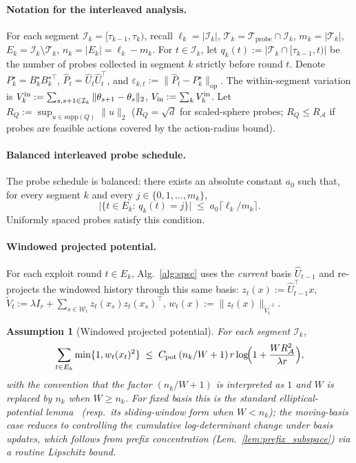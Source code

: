 \documentclass{article}
\newcommand{\op}{\mathrm{op}}
\newcommand{\cA}{\mathcal{A}}
\newcommand{\cT}{\mathcal{T}}
\newcommand{\cI}{\mathcal{I}}
\newcommand{\cW}{\mathcal{W}}
\newcommand{\cTprobe}{\mathcal{T}_{\mathrm{probe}}}
\newtheorem{assumption}{Assumption}
\begin{document}
\paragraph{Notation for the interleaved analysis.}
For each segment $\cI_k=[\tau_{k-1},\tau_k)$, recall
$\ell_k=|\cI_k|$, $\cT_k=\cTprobe\cap\cI_k$, $m_k=|\cT_k|$,
$E_k=\cI_k\setminus\cT_k$, $n_k=|E_k|=\ell_k-m_k$. For
$t\in\cI_k$, let $q_k(t):=|\cT_k\cap[\tau_{k-1},t)|$ be the number
of probes collected in segment $k$ strictly before round $t$.
Denote $P_k^\star=B_k^\star B_k^{\star\top}$,
$\widehat P_t=\widehat U_t\widehat U_t^\top$, and
$\varepsilon_{k,t}:=\|\widehat P_t-P_k^\star\|_{\op}$. The
within-segment variation is
$V_k^{\rm in}:=\sum_{s,s+1\in\cI_k}\|\theta_{s+1}-\theta_s\|_2$,
$V_{\rm in}:=\sum_k V_k^{\rm in}$. Let
$R_Q:=\sup_{u\in\mathrm{supp}(Q)}\|u\|_2$ ($R_Q=\sqrt d$ for
scaled-sphere probes; $R_Q\le R_\cA$ if probes are feasible
actions covered by the action-radius bound).

\paragraph{Balanced interleaved probe schedule.}
The probe schedule is balanced: there exists an absolute constant
$a_0$ such that, for every segment $k$ and every
$j\in\{0,1,\dots,m_k\}$,
\begin{equation}
\bigl|\{t\in E_k:\,q_k(t)=j\}\bigr|
\;\le\; a_0\bigl\lceil\ell_k/m_k\bigr\rceil.
\tag{B}\label{eq:balanced}
\end{equation}
Uniformly spaced probes satisfy this condition.

\paragraph{Windowed projected potential.}
For each exploit round $t\in E_k$, Alg.~\ref{alg:spsc} uses the
\emph{current} basis $\widehat U_{t-1}$ and re-projects the windowed
history through this same basis: $z_t(x):=\widehat U_{t-1}^\top x$,
$\widetilde V_t:=\lambda I_r+\sum_{s\in\cW_t}z_t(x_s)z_t(x_s)^\top$,
$w_t(x):=\|z_t(x)\|_{\widetilde V_t^{-1}}$.

\begin{assumption}[Windowed projected potential]
\label{ass:projected_potential}
For each segment $\cI_k$,
\begin{equation}
\sum_{t\in E_k}\min\{1,w_t(x_t)^2\}
\;\le\; C_{\rm pot}\,(n_k/W+1)\,r\log\!\Bigl(1+\frac{W R_\cA^2}{\lambda r}\Bigr),
\label{eq:projected_potential}
\end{equation}
with the convention that the factor $(n_k/W+1)$ is interpreted as $1$
and $W$ is replaced by $n_k$ when $W\ge n_k$.
For fixed basis this is the standard elliptical-potential
lemma~\citep[Lem.~11]{abbasi2011improved} (resp.\ its sliding-window
form when $W<n_k$); the moving-basis case reduces to controlling the
cumulative log-determinant change under basis updates, which follows
from prefix concentration (Lem.~\ref{lem:prefix_subspace}) via a
routine Lipschitz bound.
\end{assumption}
\end{document}
